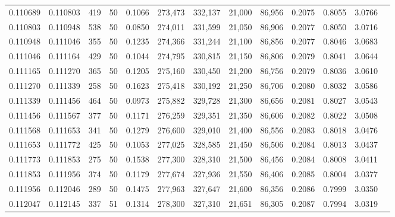 \begin{tabular}{rrrrrrrrrrrrr}
0.110689 & 0.110803 &   419 &  50 &                                     0.1066 & 273,473 & 332,137 &  21,000 &  86,956 & 0.2075 & 0.8055 & 3.0766 \\
0.110803 & 0.110948 &   538 &  50 &                                     0.0850 & 274,011 & 331,599 &  21,050 &  86,906 & 0.2077 & 0.8050 & 3.0716 \\
0.110948 & 0.111046 &   355 &  50 &                                     0.1235 & 274,366 & 331,244 &  21,100 &  86,856 & 0.2077 & 0.8046 & 3.0683 \\
0.111046 & 0.111164 &   429 &  50 &                                     0.1044 & 274,795 & 330,815 &  21,150 &  86,806 & 0.2079 & 0.8041 & 3.0644 \\
0.111165 & 0.111270 &   365 &  50 &                                     0.1205 & 275,160 & 330,450 &  21,200 &  86,756 & 0.2079 & 0.8036 & 3.0610 \\
0.111270 & 0.111339 &   258 &  50 &                                     0.1623 & 275,418 & 330,192 &  21,250 &  86,706 & 0.2080 & 0.8032 & 3.0586 \\
0.111339 & 0.111456 &   464 &  50 &                                     0.0973 & 275,882 & 329,728 &  21,300 &  86,656 & 0.2081 & 0.8027 & 3.0543 \\
0.111456 & 0.111567 &   377 &  50 &                                     0.1171 & 276,259 & 329,351 &  21,350 &  86,606 & 0.2082 & 0.8022 & 3.0508 \\
0.111568 & 0.111653 &   341 &  50 &                                     0.1279 & 276,600 & 329,010 &  21,400 &  86,556 & 0.2083 & 0.8018 & 3.0476 \\
0.111653 & 0.111772 &   425 &  50 &                                     0.1053 & 277,025 & 328,585 &  21,450 &  86,506 & 0.2084 & 0.8013 & 3.0437 \\
0.111773 & 0.111853 &   275 &  50 &                                     0.1538 & 277,300 & 328,310 &  21,500 &  86,456 & 0.2084 & 0.8008 & 3.0411 \\
0.111853 & 0.111956 &   374 &  50 &                                     0.1179 & 277,674 & 327,936 &  21,550 &  86,406 & 0.2085 & 0.8004 & 3.0377 \\
0.111956 & 0.112046 &   289 &  50 &                                     0.1475 & 277,963 & 327,647 &  21,600 &  86,356 & 0.2086 & 0.7999 & 3.0350 \\
0.112047 & 0.112145 &   337 &  51 &                                     0.1314 & 278,300 & 327,310 &  21,651 &  86,305 & 0.2087 & 0.7994 & 3.0319 \\

\end{tabular}
